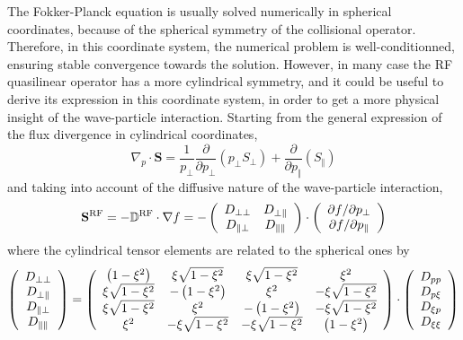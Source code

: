The Fokker-Planck equation is usually solved numerically in spherical
coordinates, because of the spherical symmetry of the collisional operator.
Therefore, in this coordinate system, the numerical problem is
well-conditionned, ensuring stable convergence towards the solution. However,
in many case the RF quasilinear operator has a more cylindrical symmetry, and
it could be useful to derive its expression in this coordinate system, in
order to get a more physical insight of the wave-particle interaction.
Starting from the general expression of the flux divergence in cylindrical
coordinates,
\begin{equation}
\nabla_{p}\cdot\mathbf{S}=\frac{1}{p_{\bot}}\frac{\partial}{\partial p_{\bot}%
}\left(  p_{\bot}S_{\bot}\right)  +\frac{\partial}{\partial p_{\Vert}}\left(
S_{\Vert}\right)  \label{divcyl}%
\end{equation}
and taking into account of the diffusive nature of the wave-particle
interaction,
\begin{equation}
\mathbf{S}^{\text{RF}}=-\mathbb{{D}}^{\text{RF}}\cdot\nabla f=-\left(
\begin{array}
[c]{cc}%
D_{\bot\bot} & D_{\bot\Vert}\\
D_{\Vert\bot} & D_{\Vert\Vert}%
\end{array}
\right)  \cdot\left(
\begin{array}
[c]{c}%
\partial f/\partial p_{\bot}\\
\partial f/\partial p_{\Vert}%
\end{array}
\right)
\end{equation}
where the cylindrical tensor elements are related to the spherical ones by
\begin{equation}
\left(
\begin{array}
[c]{c}%
D_{\bot\bot}\\
D_{\bot\Vert}\\
D_{\Vert\bot}\\
D_{\Vert\Vert}%
\end{array}
\right)  =\left(
\begin{array}
[c]{cccc}%
\left(  1-\xi^{2}\right)  & \xi\sqrt{1-\xi^{2}} & \xi\sqrt{1-\xi^{2}} &
\xi^{2}\\
\xi\sqrt{1-\xi^{2}} & -\left(  1-\xi^{2}\right)  & \xi^{2} & -\xi\sqrt
{1-\xi^{2}}\\
\xi\sqrt{1-\xi^{2}} & \xi^{2} & -\left(  1-\xi^{2}\right)  & -\xi\sqrt
{1-\xi^{2}}\\
\xi^{2} & -\xi\sqrt{1-\xi^{2}} & -\xi\sqrt{1-\xi^{2}} & \left(  1-\xi
^{2}\right)
\end{array}
\right)  \cdot\left(
\begin{array}
[c]{c}%
D_{pp}\\
D_{p\xi}\\
D_{\xi p}\\
D_{\xi\xi}%
\end{array}
\right)
\end{equation}

